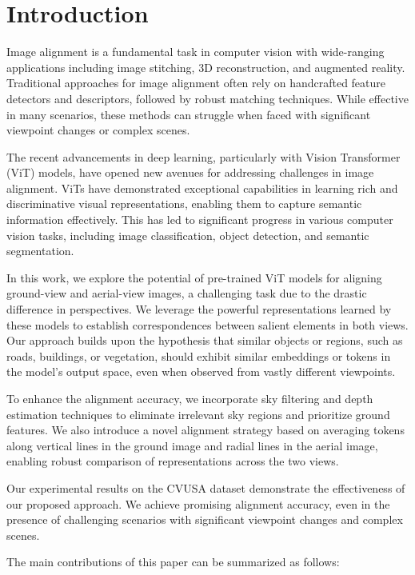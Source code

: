 \section{Introduction}
\label{sec:intro}

Image alignment is a fundamental task in computer vision with wide-ranging applications including image stitching, 3D reconstruction, and augmented reality. Traditional approaches for image alignment often rely on handcrafted feature detectors and descriptors, followed by robust matching techniques. While effective in many scenarios, these methods can struggle when faced with significant viewpoint changes or complex scenes. 

The recent advancements in deep learning, particularly with Vision Transformer (ViT) models, have opened new avenues for addressing challenges in image alignment. ViTs have demonstrated exceptional capabilities in learning rich and discriminative visual representations, enabling them to capture semantic information effectively. This has led to significant progress in various computer vision tasks, including image classification, object detection, and semantic segmentation. 

In this work, we explore the potential of pre-trained ViT models for aligning ground-view and aerial-view images, a challenging task due to the drastic difference in perspectives. We leverage the powerful representations learned by these models to establish correspondences between salient elements in both views. Our approach builds upon the hypothesis that similar objects or regions, such as roads, buildings, or vegetation, should exhibit similar embeddings or tokens in the model's output space, even when observed from vastly different viewpoints.

To enhance the alignment accuracy, we incorporate sky filtering and depth estimation techniques to eliminate irrelevant sky regions and prioritize ground features. We also introduce a novel alignment strategy based on averaging tokens along vertical lines in the ground image and radial lines in the aerial image, enabling robust comparison of representations across the two views. 

Our experimental results on the CVUSA dataset demonstrate the effectiveness of our proposed approach. We achieve promising alignment accuracy, even in the presence of challenging scenarios with significant viewpoint changes and complex scenes. 

The main contributions of this paper can be summarized as follows:

